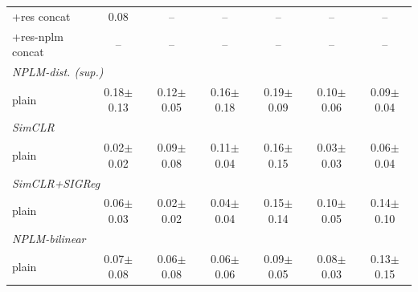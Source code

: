 \begin{center}
\begin{longtable}{lcccccc}
\quad +res concat & 0.08 & -- & -- & -- & -- & -- \\
\quad +res-nplm concat & -- & -- & -- & -- & -- & -- \\
\multicolumn{7}{l}{\emph{NPLM-dist. (sup.)}} \\
\quad plain & 0.18$\pm$0.13 & 0.12$\pm$0.05 & 0.16$\pm$0.18 & 0.19$\pm$0.09 & 0.10$\pm$0.06 & 0.09$\pm$0.04 \\
\multicolumn{7}{l}{\emph{SimCLR}} \\
\quad plain & 0.02$\pm$0.02 & 0.09$\pm$0.08 & 0.11$\pm$0.04 & 0.16$\pm$0.15 & 0.03$\pm$0.03 & 0.06$\pm$0.04 \\
\multicolumn{7}{l}{\emph{SimCLR+SIGReg}} \\
\quad plain & 0.06$\pm$0.03 & 0.02$\pm$0.02 & 0.04$\pm$0.04 & 0.15$\pm$0.14 & 0.10$\pm$0.05 & 0.14$\pm$0.10 \\
\multicolumn{7}{l}{\emph{NPLM-bilinear}} \\
\quad plain & 0.07$\pm$0.08 & 0.06$\pm$0.08 & 0.06$\pm$0.06 & 0.09$\pm$0.05 & 0.08$\pm$0.03 & 0.13$\pm$0.15 \\
\end{longtable}
\end{center}
